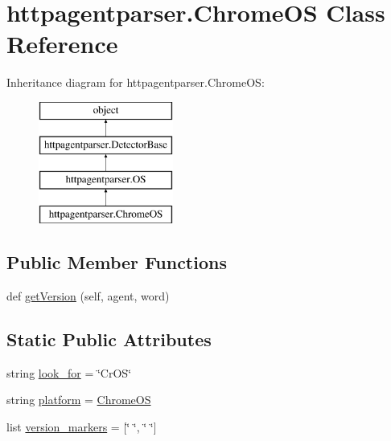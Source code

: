 \hypertarget{classhttpagentparser_1_1_chrome_o_s}{}\section{httpagentparser.\+Chrome\+OS Class Reference}
\label{classhttpagentparser_1_1_chrome_o_s}
Inheritance diagram for httpagentparser.\+Chrome\+OS\+:\begin{figure}[H]
\begin{center}
\leavevmode
\includegraphics[height=4.000000cm]{classhttpagentparser_1_1_chrome_o_s}
\end{center}
\end{figure}
\subsection*{Public Member Functions}
\begin{DoxyCompactItemize}
\item 
def \hyperlink{classhttpagentparser_1_1_chrome_o_s_a176ef37b2732253083cc283e550f4d45}{get\+Version} (self, agent, word)
\end{DoxyCompactItemize}
\subsection*{Static Public Attributes}
\begin{DoxyCompactItemize}
\item 
string \hyperlink{classhttpagentparser_1_1_chrome_o_s_ae319b452a81e7394b07a1ba05d3e0acc}{look\+\_\+for} = \char`\"{}Cr\+OS\char`\"{}
\item 
string \hyperlink{classhttpagentparser_1_1_chrome_o_s_a9e040ea82b5f9ebb910f44b88fb3c645}{platform} = \textquotesingle{} \hyperlink{classhttpagentparser_1_1_chrome_o_s}{Chrome\+OS}\textquotesingle{}
\item 
list \hyperlink{classhttpagentparser_1_1_chrome_o_s_a0fab6783e21ada3b769411d39b60759e}{version\+\_\+markers} = \mbox{[}\char`\"{} \char`\"{}, \char`\"{} \char`\"{}\mbox{]}
\end{DoxyCompactItemize}
